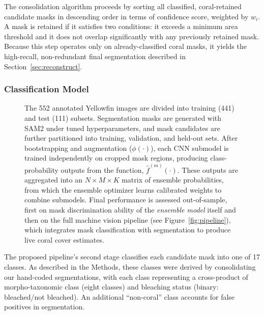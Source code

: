 \documentclass[11pt]{elsarticle}
\begin{document}
The consolidation algorithm proceeds by sorting all classified, coral-retained candidate masks in descending order in terms of confidence score, weighted by $w_i$. A mask is retained if it satisfies two conditions: it exceeds a minimum area threshold and it does not overlap significantly with any previously retained mask.
Because this step operates only on already-classified coral masks, it yields the high-recall, non-redundant final segmentation described in Section~\ref{sec:reconstruct}.

\subsubsection{Classification Model}
\label{sec:cnn}

\begin{figure}
    \centering
    \resizebox{0.9\textheight}{!}{%
        
    }
    \caption{The 552 annotated Yellowfin images are divided into training (441) and test (111) subsets. Segmentation masks are generated with SAM2 under tuned hyperparameters, and mask candidates are further partitioned into training, validation, and held-out sets. After bootstrapping and augmentation ($\phi(\cdot)$), each CNN submodel is trained independently on cropped mask regions, producing class-probability outputs from the function, $\hat{f}^{(m)}(\cdot)$. These outputs are aggregated into an $N \times M \times K$ matrix of ensemble probabilities, from which the ensemble optimizer learns calibrated weights to combine submodels. Final performance is assessed out-of-sample, first on mask discrimination ability of the \emph{ensemble model} itself and then on the full machine vision pipeline (see Figure~\ref{fig:pipeline}), which integrates mask classification with segmentation to produce live coral cover estimates.}
    \label{fig:training_pipeline}
\end{figure}

The proposed pipeline's second stage classifies each candidate mask into one of 17 classes. As described in the Methods, these classes were derived by consolidating our hand-coded segmentations, with each class representing a cross-product of morpho-taxonomic class (eight classes) and bleaching status (binary: bleached/not bleached). An additional ``non-coral'' class accounts for false positives in segmentation.
\end{document}
